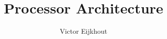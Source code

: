 \documentclass[11pt,headernav]{beamer}
\begin{document}
\title{Processor Architecture}
\author[Eijkhout]{Victor Eijkhout}
\date{\hpcsemester}

\begin{frame}
  \titlepage
\end{frame}


\end{document}
